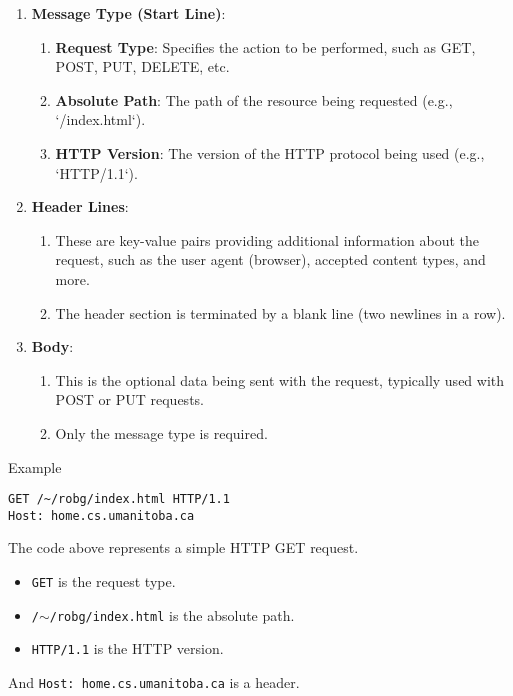 \begin{enumerate}
    \item \textbf{Message Type (Start Line)}:
    \begin{enumerate}
        \item \textbf{Request Type}: Specifies the action to be performed, such as GET, POST, PUT, DELETE, etc.
        \item \textbf{Absolute Path}:  The path of the resource being requested (e.g., `/index.html`).
        \item \textbf{HTTP Version}: The version of the HTTP protocol being used (e.g., `HTTP/1.1`).
    \end{enumerate}
    \item \textbf{Header Lines}:
    \begin{enumerate}
        \item These are key-value pairs providing additional information about the request, such as the user agent (browser), accepted content types, and more.
        \item The header section is terminated by a blank line (two newlines in a row).
    \end{enumerate}
    \item \textbf{Body}:
    \begin{enumerate}
        \item This is the optional data being sent with the request, typically used with POST or PUT requests.
        \item Only the message type is required.
    \end{enumerate}
\end{enumerate}


\begin{example}{Example}
\begin{lstlisting}
GET /~/robg/index.html HTTP/1.1
Host: home.cs.umanitoba.ca			
\end{lstlisting}

The code above represents a simple HTTP GET request.
\begin{itemize}[noitemsep]
    \item \texttt{GET} is the request type.
    \item \texttt{/$\sim$/robg/index.html} is the absolute path.
    \item \texttt{HTTP/1.1} is the HTTP version.
\end{itemize}
And \texttt{Host: home.cs.umanitoba.ca} is a header.
\end{example}

